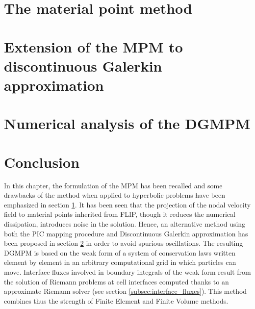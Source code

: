 \section{The material point method}
\label{sec:MPM}


\section{Extension of the MPM to discontinuous Galerkin approximation}
\label{sec:DGMPM}


\section{Numerical analysis of the DGMPM}
\label{sec:DGMPM_analysis}


\section{Conclusion}
In this chapter, the formulation of the MPM has been recalled and some drawbacks of the method when applied to hyperbolic problems have been emphasized in section \ref{sec:MPM}.
It has been seen that the projection of the nodal velocity field to material points inherited from FLIP, though it reduces the numerical dissipation, introduces noise in the solution.
Hence, an alternative method using both the PIC mapping procedure and Discontinuous Galerkin approximation has been proposed in section \ref{sec:DGMPM} in order to avoid spurious oscillations.
The resulting DGMPM is based on the weak form of a system of conservation laws written element by element in an arbitrary computational grid in which particles can move.
Interface fluxes involved in boundary integrals of the weak form result from the solution of Riemann problems at cell interfaces computed thanks to an approximate Riemann solver (see section \ref{subsec:interface_fluxes}).
This method combines thus the strength of Finite Element and Finite Volume methods.


